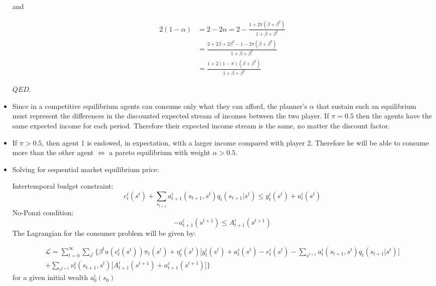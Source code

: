 \documentclass[12pt,a4paper]{article}
\begin{document}
\begin{itemize}
  and

  \begin{align*}
    2(1-\alpha) & = 2 - 2\alpha = 2 -\frac{1 + 2\pi(\beta + \beta^2)}{1 + \beta + \beta^2} \\
    & = \frac{2 + 2\beta + 2 \beta^2 - 1 - 2\pi(\beta + \beta^2)}{1 + \beta + \beta^2} \\
    & = \frac{1 + 2(1 -\pi)(\beta + \beta^2)}{1 + \beta + \beta^2}
  \end{align*}

  $QED$.

  \item Since in a competitive equilibrium agents can consume only what they can afford, the planner's $\alpha$ that sustain such an equilibrium must represent the differences in the discounted expected stream of incomes between the two player. If $\pi = 0.5$ then the agents have the same expected income for each period. Therefore their expected income stream is the same, no matter the discount factor.

  \item If $\pi > 0.5$, then agent 1 is endowed, in expectation, with a larger income compared with player 2. Therefore he will be able to consume more than the other agent $\Leftrightarrow$ a pareto equilibrium with weight $\alpha > 0.5$.

\item Solving for sequential market equilibrium price:

Intertemporal budget constraint: 
\begin{equation*}
    c_{t}^{i}(s^t)+\sum_{s_{t+1}}a_{t+1}^{i}(s_{t+1},s^{t})q_t(s_{t+1}|s^{t})\leq y_{t}^{i}(s^t)+a_{t}^{i}(s^t)
\end{equation*}
No-Ponzi condition: 
\begin{equation*}
    -a_{t+1}^{i}(s^{t+1}) \leq A_{t+1}^{i}(s^{t+1})
\end{equation*}
The Lagrangian for the consumer problem will be given by: 


\begin{multline*}
    \mathcal{L}=\sum_{t=0}^{\infty}\sum_{s^t}\bigg\{
    \beta^t u(c_{t}^{i}(s^t))\pi_t(s^t)+\eta_{t}^{i}(s^t)\bigg[y_{t}^{i}(s^t)+a_{t}^{i}(s^t)-c_{t}^{i}(s^t)-\sum_{s^{t+1}}a_{t}^{i}(s_{t+1},s^t)q_t(s_{t+1}|s^{t})\bigg]\\
    +\sum_{s^{t+1}}\nu_{t}^{i}(s_{t+1},s^t)\bigg[A_{t+1}^{i}(s^{t+1})+a_{t+1}^{i}(s^{t+1})\bigg]\bigg\}
\end{multline*}
for a given initial wealth $a_0^{i}(s_0)$\\


\end{itemize}
\end{document}
